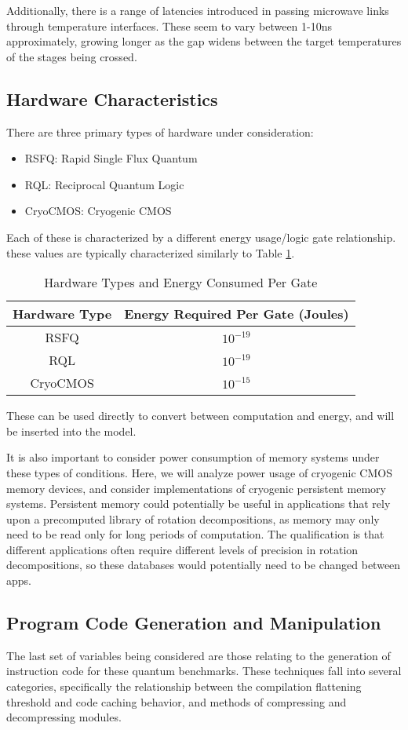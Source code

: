 Additionally, there is a range of latencies introduced in passing microwave links through temperature interfaces. These seem to vary between 1-10ns approximately, growing longer as the gap widens between the target temperatures of the stages being crossed.

\subsection*{Hardware Characteristics}

There are three primary types of hardware under consideration:
\begin{itemize}
	\item RSFQ: Rapid Single Flux Quantum
	\item RQL: Reciprocal Quantum Logic
	\item CryoCMOS: Cryogenic CMOS
\end{itemize}
Each of these is characterized by a different energy usage/logic gate relationship. these values are typically characterized similarly to Table \ref{t2}.
\begin{table}[h!]
	\centering
	\begin{tabular}{|c|c|}
	\hline
	Hardware Type & Energy Required Per Gate (Joules) \\ \hline
	RSFQ & $10^{-19}$ \\ \hline
	RQL & $10^{-19}$ \\ \hline
	CryoCMOS & $10^{-15}$ \\
	\hline
	\end{tabular}
	\caption{Hardware Types and Energy Consumed Per Gate}\label{t2}
\end{table}

These can be used directly to convert between computation and energy, and will be inserted into the model.

It is also important to consider power consumption of memory systems under these types of conditions. Here, we will analyze power usage of cryogenic CMOS memory devices, and consider implementations of cryogenic persistent memory systems. Persistent memory could potentially be useful in applications that rely upon a precomputed library of rotation decompositions, as memory may only need to be read only for long periods of computation. The qualification is that different applications often require different levels of precision in rotation decompositions, so these databases would potentially need to be changed between apps.

\subsection*{Program Code Generation and Manipulation}

The last set of variables being considered are those relating to the generation of instruction code for these quantum benchmarks. These techniques fall into several categories, specifically the relationship between the compilation flattening threshold and code caching behavior, and methods of compressing and decompressing modules. 
